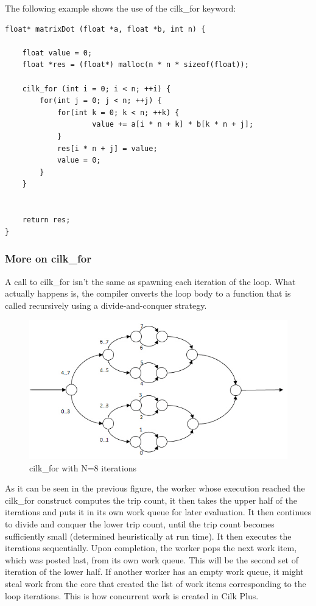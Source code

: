 \documentclass[a4paper,10pt,openright,openbib,twocolumn]{article}
\begin{document}
The following example shows the use of the cilk\_for keyword:

\begin{minipage}{.45\textwidth}
\begin{lstlisting}[caption=Matrix multiplication using Cilk Plus]
float* matrixDot (float *a, float *b, int n) {
    
    float value = 0;
    float *res = (float*) malloc(n * n * sizeof(float));

    cilk_for (int i = 0; i < n; ++i) {
        for(int j = 0; j < n; ++j) {            
            for(int k = 0; k < n; ++k) {
                    value += a[i * n + k] * b[k * n + j];
            }
            res[i * n + j] = value;
            value = 0;
        }
    }
    
    
    return res;
}
\end{lstlisting}    
\end{minipage}

\subsubsection{More on cilk\_for}
A call to cilk\_for isn't the same as spawning each iteration of the loop. What actually happens is, the compiler onverts the loop body to a function that is called recursively using a divide-and-conquer strategy. \\
    \begin{figure}[!htb]
            \centering
            \includegraphics[scale=0.9]{../pres/images/cilkfor.jpg}
            \caption{cilk\_for with N=8 iterations}
            \label{roofline}
        \end{figure}
        
As it can be seen in the previous figure, the worker whose execution reached the cilk\_for construct computes the trip count, it then takes the upper half of the iterations and puts it in its own work queue for later evaluation. It then continues to divide and conquer the lower trip count, until the trip count becomes sufficiently small (determined heuristically at run time). It then executes the iterations sequentially. Upon completion, the worker pops the next work item, which was posted last, from its own work queue. This will be the second set of iteration of the lower half. If another worker has an empty work queue, it might steal work from the core that created the list of work items corresponding to the loop iterations. This is how concurrent work is created in Cilk Plus.
\end{document}
